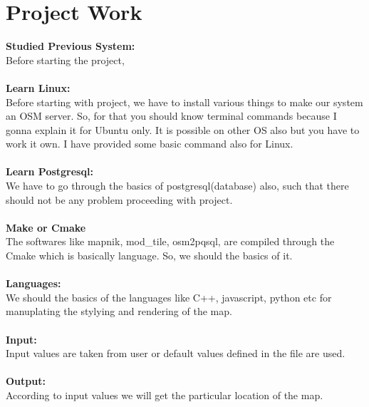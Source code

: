 \section{Project Work} 
\textbf{Studied Previous System:}\\
Before starting the project, \\\\
\textbf{Learn Linux:}\\
Before starting with project, we have to install various things to make our system an OSM server. So, for that you should know terminal commands because I gonna explain it for Ubuntu only. It is possible on other OS also but you have to work it own. I have provided some basic command also for Linux. \\\\
\textbf{Learn Postgresql:}\\
 We have to go through the basics of postgresql(database) also, such that there
should not be any problem proceeding with project.\\\\
\textbf{Make or Cmake}\\
The softwares like mapnik, mod\_tile, osm2pqsql, are compiled through the Cmake which is basically language. So, we should the basics of it.
\\\\
\textbf{Languages:}\\
We should the basics of the languages like C++, javascript, python etc for manuplating the stylying and rendering of the map.\\\\
\textbf{Input:}\\
Input values are taken from user or default values defined in the file are used.\\\\
\textbf{Output:}\\
According to input values we will get the particular location of the map.

